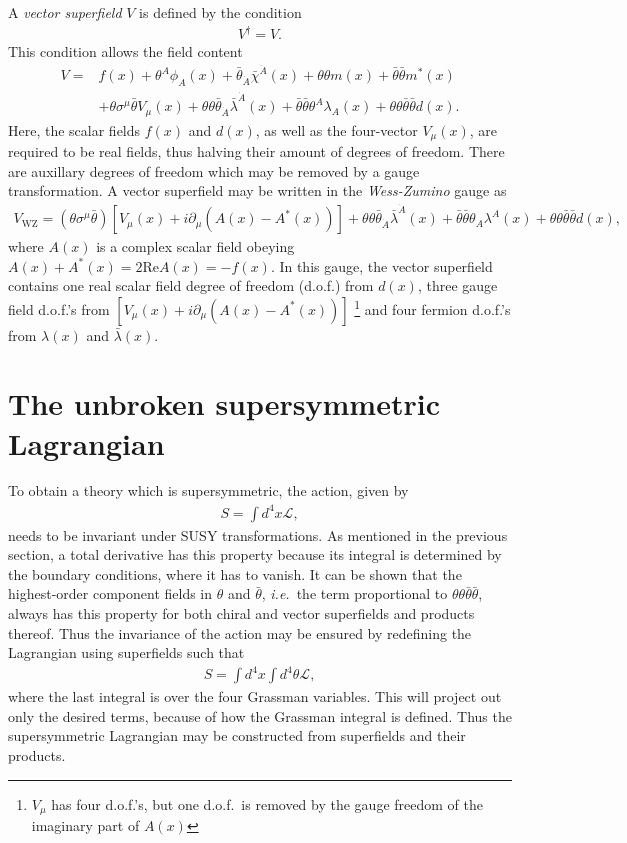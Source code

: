 \documentclass[twoside,english]{uiofysmaster}
\begin{document}
A {\it vector superfield} $V$ is defined by the condition
\begin{align}
	V^\dag = V.
\end{align}
This condition allows the field content
\begin{align}
	V = &f(x) + \theta^A\phi_A(x) + \bar\theta_{\dot A}\bar\chi^{\dot A}(x) + \theta \theta m(x) + \bar\theta \bar\theta m^*(x)\\
	 &+ \theta\sigma^\mu \bar\theta V_\mu(x) + \theta\theta\bar\theta_{\dot A}\bar\lambda^{\dot A}(x) + \bar\theta \bar\theta \theta^A \lambda_A(x) + \theta \theta \bar\theta \bar\theta d(x).
\end{align}
Here, the scalar fields $f(x)$ and $d(x)$, as well as the four-vector $V_\mu (x)$, are required to be real fields, thus halving their amount of degrees of freedom. There are auxillary degrees of freedom which may be removed by a gauge transformation. A vector superfield may be written in the {\it Wess-Zumino} gauge as
\begin{align}
	V_\mathrm{WZ} = (\theta \sigma^\mu \bar\theta) \left[ V_\mu(x) + i\partial_\mu (A(x) - A^*(x)) \right] + \theta\theta \bar\theta_{\dot A} \bar\lambda^{\dot A}(x) + \bar\theta \bar\theta \theta_A \lambda^A(x) + \theta\theta \bar\theta \bar\theta d(x),
\end{align}
where $A(x)$ is a complex scalar field obeying $A(x) + A^*(x) = 2\mathrm{Re}A(x) = -f(x)$. In this gauge, the vector superfield contains one real scalar field degree of freedom (d.o.f.) from $d(x)$, three gauge field d.o.f.'s from $\left[ V_\mu(x) + i\partial_\mu (A(x) - A^*(x)) \right]$ \footnote{$V_\mu$ has four d.o.f.'s, but one d.o.f.\ is removed by the gauge freedom of the imaginary part of $A(x)$} and four fermion d.o.f.'s from $\lambda(x)$ and $\bar\lambda(x)$.

\section{The unbroken supersymmetric Lagrangian}
\label{sec:unbroken_susy}
To obtain a theory which is supersymmetric, the action, given by
\begin{align}
 	S = \int d^4 x \mathcal{L},
 \end{align}
 needs to be invariant under SUSY transformations. As mentioned in the previous section, a total derivative has this property because its integral is determined by the boundary conditions, where it has to vanish. It can be shown that the highest-order component fields in $\theta$ and $\bar \theta$, {\it i.e.}\ the term proportional to $\theta\theta\bar\theta\bar\theta$, always has this property for both chiral and vector superfields and products thereof. Thus the invariance of the action may be ensured by redefining the Lagrangian using superfields such that
 \begin{align}
 	S = \int d^4 x \int d^4 \theta \mathcal{L},
 \end{align}
 where the last integral is over the four Grassman variables. This will project out only the desired terms, because of how the Grassman integral is defined. Thus the supersymmetric Lagrangian may be constructed from superfields and their products.
\end{document}

